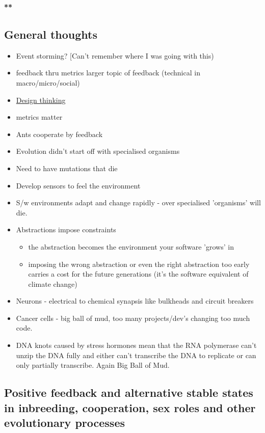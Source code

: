 \documentclass[11pt]{article}
\begin{document}
\textbf{**}
\subsection{General thoughts}
\label{sec:org4061a8c}
\begin{itemize}
\item Event storming? [Can't remember where I was going with this)
\item feedback thru metrics larger topic of feedback (technical in macro/micro/social)
\item \href{https://medium.com/featured-insights/understanding-how-design-thinking-lean-and-agile-work-together-88b123a2bc6a}{Design thinking}
\item metrics matter
\item Ants cooperate by feedback
\item Evolution didn't start off with specialised organisms
\item Need to have mutations that die
\item Develop sensors to feel the environment
\item S/w environments adapt and change rapidly - over specialised
'organisms' will die.
\item Abstractions impose constraints
\begin{itemize}
\item the abstraction becomes the
environment your software 'grows' in
\item imposing the wrong abstraction or even the right abstraction
too early carries a cost for the future generations (it's the
software equivalent of climate change)
\end{itemize}
\item Neurons - electrical to chemical synapsis like bulkheads and
circuit breakers
\item Cancer cells - big ball of mud, too many projects/dev's changing
too much code.
\item DNA knots caused by stress hormones mean that the RNA polymerase can't unzip the DNA fully and either can't transcribe the DNA to replicate or can only partially transcribe. Again Big Ball of Mud.
\end{itemize}

\subsection{Positive feedback and alternative stable states in inbreeding, cooperation, sex roles and other evolutionary processes}
\label{sec:orge2be8fe}
\end{document}
